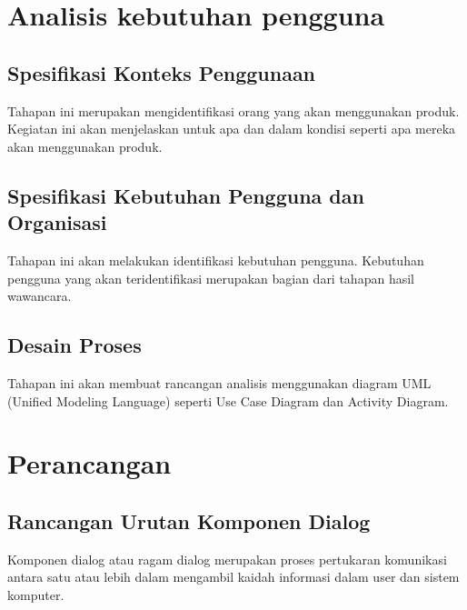 \section{Analisis kebutuhan pengguna}

\subsection{Spesifikasi Konteks Penggunaan}
\begin{subsectioncontent}
    \hspace{\parindent}Tahapan ini merupakan mengidentifikasi orang yang akan menggunakan produk. Kegiatan ini akan menjelaskan untuk apa dan dalam kondisi seperti apa mereka akan menggunakan produk.
\end{subsectioncontent}

\subsection{Spesifikasi Kebutuhan Pengguna dan Organisasi}
\begin{subsectioncontent}
    \hspace{\parindent}Tahapan ini akan melakukan identifikasi kebutuhan pengguna. Kebutuhan pengguna yang akan teridentifikasi merupakan bagian dari tahapan hasil wawancara.
\end{subsectioncontent}

\subsection{Desain Proses}
\begin{subsectioncontent}
    \hspace{\parindent}Tahapan ini akan membuat rancangan analisis menggunakan diagram UML (Unified Modeling Language) seperti Use Case Diagram dan Activity Diagram.
\end{subsectioncontent}

\section{Perancangan}

\subsection{Rancangan Urutan Komponen Dialog}
\begin{subsectioncontent}
    \hspace{\parindent}Komponen dialog atau ragam dialog merupakan proses pertukaran komunikasi antara satu atau lebih dalam mengambil kaidah informasi dalam user dan sistem komputer.
\end{subsectioncontent}

